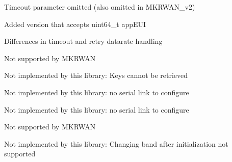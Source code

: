 
\begin{DoxyRefList}
\item[Module \mbox{\hyperlink{classSTM32LoRaWAN_amgrpb065e2dd26e727fc866b5360d675a71b}{O\+T\+AA Join}} ]\label{extensions__extensions000001}%
%
 Timeout parameter omitted (also omitted in M\+K\+R\+W\+A\+N\+\_\+v2) 

Added version that accepts uint64\+\_\+t app\+E\+UI 

Differences in timeout and retry datarate handling 
\item[Module \mbox{\hyperlink{classSTM32LoRaWAN_amgrp6a967c1d96e6900d14206c0d4ef2c3ea}{Setters for identifiers and keys}} ]\label{extensions__extensions000010}%
%
 Not supported by M\+K\+R\+W\+AN


\item[Member \mbox{\hyperlink{classSTM32LoRaWAN_af5a44ca0779d52ba0ed35235dd92e107}{S\+T\+M32\+Lo\+Ra\+W\+AN::application\+Key}} ()]\label{extensions__extensions000044}%
%
 Not implemented by this library\+: Keys cannot be retrieved  
\item[Member \mbox{\hyperlink{classSTM32LoRaWAN_a51adb005319aa9c4ccb2f63b246789a1}{S\+T\+M32\+Lo\+Ra\+W\+AN::auto\+Baud}} (unsigned long timeout=10000L)]\label{extensions__extensions000029}%
%
 Not implemented by this library\+: no serial link to configure  
\item[Member \mbox{\hyperlink{classSTM32LoRaWAN_a01766fa6242b566fde0010eef9707372}{S\+T\+M32\+Lo\+Ra\+W\+AN::begin}} (\+\_\+lora\+\_\+band band, uint32\+\_\+t baud, uint16\+\_\+t config=S\+E\+R\+I\+A\+L\+\_\+8\+N2)]\label{extensions__extensions000028}%
%
 Not implemented by this library\+: no serial link to configure  
\item[Member \mbox{\hyperlink{classSTM32LoRaWAN_ab3335b40c9a640200c4e3c345859ac80}{S\+T\+M32\+Lo\+Ra\+W\+AN::busy}} ()]\label{extensions__extensions000011}%
%
 Not supported by M\+K\+R\+W\+AN  
\item[Member \mbox{\hyperlink{classSTM32LoRaWAN_a8c9e66574bd8137330de4067ee3bf2b8}{S\+T\+M32\+Lo\+Ra\+W\+AN::configure\+Band}} (\+\_\+lora\+\_\+band band)]\label{extensions__extensions000049}%
%
 Not implemented by this library\+: Changing band after initialization not supported  
\item[Member \mbox{\hyperlink{classSTM32LoRaWAN_a077e0794bb3ac3c199f13e486933417b}{S\+T\+M32\+Lo\+Ra\+W\+AN::configure\+Class}} (\+\_\+lora\+\_\+class \+\_\+class)]\label{extensions__extensions000041}%

\end{DoxyRefList}
